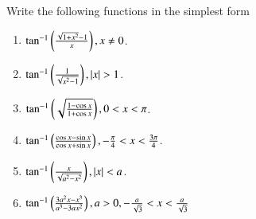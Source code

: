 Write the following functions in the simplest form
\begin{enumerate}[label=\thesubsection.\arabic*,ref=\thesubsection.\theenumi,resume*,itemsep=1ex]
	\item 
		$\tan^{-1}\left(\frac{\sqrt{1+x^2}-1}{x}\right),
x \ne 0$.
	\item 
		$\tan^{-1}\left(\frac{1}{\sqrt{x^2-1}}\right),
		\left\vert x\right\vert > 1$.
	\item 
		$\tan^{-1}\left(\sqrt{\frac{1-\cos x}{1+\cos x}}\right),
		0 < {x} < \pi$.
	\item 
		$\tan^{-1}\left(\frac{\cos x-\sin x}{\cos x+\sin x}\right),
-\frac{\pi}{4} < x < \frac{3\pi}{4}$.
	\item 
		$\tan^{-1}\left(\frac{x}{\sqrt{a^2-x^2}}\right),
		\left\vert x\right\vert < a$.
	\item 
		$\tan^{-1}\left(\frac{3a^2x-x^3}{{a^3-3ax^2}}\right),
		a > 0,
		-\frac{a}{\sqrt{3}} < x < \frac{a}{\sqrt{3}}$
\end{enumerate}
